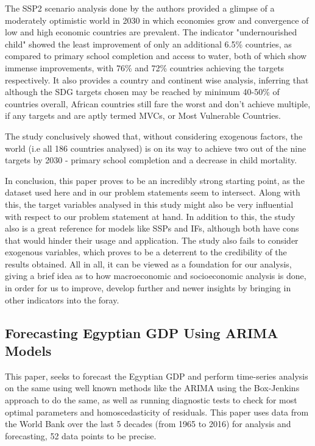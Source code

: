 \documentclass[conference]{IEEEtran}
\begin{document}
The SSP2 scenario analysis done by the authors provided a glimpse of a moderately optimistic world in 2030 in which economies grow and convergence of low and high economic countries are prevalent. The indicator "undernourished child" showed the least improvement of only an additional 6.5\% countries, as compared to primary school completion and access to water, both of which show immense improvements, with 76\% and 72\% countries achieving the targets respectively. It also provides a country and continent wise analysis, inferring that although the SDG targets chosen may be reached by minimum 40-50\% of countries overall, African countries still fare the worst and don't achieve multiple, if any targets and are aptly termed MVCs, or Most Vulnerable Countries.

The study conclusively showed that, without considering exogenous factors, the world (i.e all 186 countries analysed) is on its way to achieve two out of the nine targets by 2030 - primary school completion and a decrease in child mortality. 

In conclusion, this paper proves to be an incredibly strong starting point, as the dataset used here and in our problem statements seem to intersect. Along with this, the target variables analysed in this study might also be very influential with respect to our problem statement at hand. In addition to this, the study also is a great reference for models like SSPs and IFs, although both have cons that would hinder their usage and application. The study also fails to consider exogenous variables, which proves to be a deterrent to the credibility of the results obtained. All in all, it can be viewed as a foundation for our analysis, giving a brief idea as to how macroeconomic and socioeconomic analysis is done, in order for us to improve, develop further and newer insights by bringing in other indicators into the foray.

\subsection{Forecasting Egyptian GDP Using ARIMA Models}

This paper\cite{forecastegypt}, seeks to forecast the Egyptian GDP and perform time-series analysis on the same using well known methods like the ARIMA using the Box-Jenkins approach to do the same, as well as running diagnostic tests to check for most optimal parameters and homoscedasticity of residuals. This paper uses data from the World Bank over the last 5 decades (from 1965 to 2016) for analysis and forecasting, 52 data points to be precise. 
\end{document}
